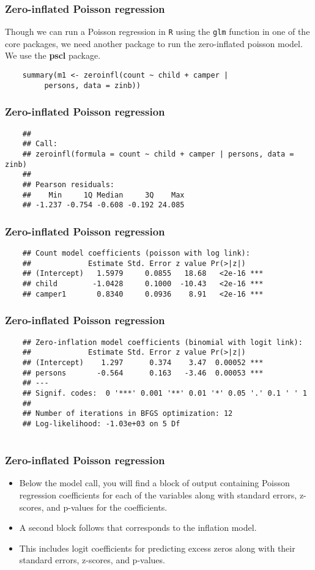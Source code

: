 \documentclass[MASTER.tex]{subfiles}
\begin{document}
\begin{frame}[fragile]
\frametitle{Zero-inflated Poisson regression}
	Though we can run a Poisson regression in \texttt{R} using the \texttt{glm} function in one of the core packages, we need another package to run the zero-inflated poisson model. We use the \textbf{pscl} package.
\begin{verbatim}
	summary(m1 <- zeroinfl(count ~ child + camper | 
	     persons, data = zinb))
\end{verbatim}
\end{frame}
\begin{frame}[fragile]
\frametitle{Zero-inflated Poisson regression}
\begin{verbatim}
	## 
	## Call:
	## zeroinfl(formula = count ~ child + camper | persons, data = zinb)
	## 
	## Pearson residuals:
	##    Min     1Q Median     3Q    Max 
	## -1.237 -0.754 -0.608 -0.192 24.085 
\end{verbatim}
\end{frame}
\begin{frame}[fragile]
\frametitle{Zero-inflated Poisson regression}
\begin{verbatim}
	## Count model coefficients (poisson with log link):
	##             Estimate Std. Error z value Pr(>|z|)    
	## (Intercept)   1.5979     0.0855   18.68   <2e-16 ***
	## child        -1.0428     0.1000  -10.43   <2e-16 ***
	## camper1       0.8340     0.0936    8.91   <2e-16 ***
\end{verbatim}
\end{frame}
\begin{frame}[fragile]
	\frametitle{Zero-inflated Poisson regression}
	\begin{verbatim}
	## Zero-inflation model coefficients (binomial with logit link):
	##             Estimate Std. Error z value Pr(>|z|)    
	## (Intercept)    1.297      0.374    3.47  0.00052 ***
	## persons       -0.564      0.163   -3.46  0.00053 ***
	## ---
	## Signif. codes:  0 '***' 0.001 '**' 0.01 '*' 0.05 '.' 0.1 ' ' 1 
	## 
	## Number of iterations in BFGS optimization: 12 
	## Log-likelihood: -1.03e+03 on 5 Df
	
\end{verbatim}
\end{frame}

\begin{frame}[fragile]
\frametitle{Zero-inflated Poisson regression}
\begin{itemize}
\item	Below the model call, you will find a block of output containing Poisson regression coefficients for each of the variables along with standard errors, z-scores, and p-values for the coefficients. 
\item A second block follows that corresponds to the inflation model. 
\item This includes logit coefficients for predicting excess zeros along with their standard errors, z-scores, and p-values.
\end{itemize}
\end{frame}
\end{document}
